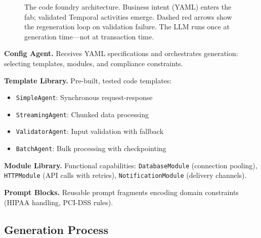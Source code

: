 \documentclass[11pt]{article}
\begin{document}
\begin{figure}[ht]
{
}%
\caption{The code foundry architecture. Business intent (YAML) enters the fab; validated Temporal activities emerge. Dashed red arrows show the regeneration loop on validation failure. The LLM runs once at generation time—not at transaction time.}
\label{fig:architecture}
\end{figure}

\textbf{Config Agent.} Receives YAML specifications and orchestrates generation: selecting templates, modules, and compliance constraints.

\textbf{Template Library.} Pre-built, tested code templates:
\begin{itemize}
    \item \texttt{SimpleAgent}: Synchronous request-response
    \item \texttt{StreamingAgent}: Chunked data processing
    \item \texttt{ValidatorAgent}: Input validation with fallback
    \item \texttt{BatchAgent}: Bulk processing with checkpointing
\end{itemize}

\textbf{Module Library.} Functional capabilities: \texttt{DatabaseModule} (connection pooling), \texttt{HTTPModule} (API calls with retries), \texttt{NotificationModule} (delivery channels).

\textbf{Prompt Blocks.} Reusable prompt fragments encoding domain constraints (HIPAA handling, PCI-DSS rules).

\subsection{Generation Process}
\end{document}
